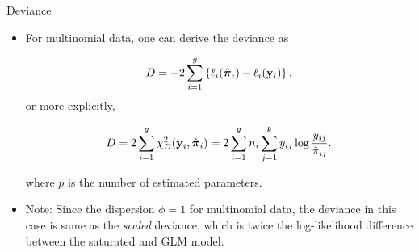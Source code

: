 \documentclass{beamer}
\newcommand{\boldpi}{{\boldsymbol \pi}}
\newcommand{\ringLambda}{\mathring{\Lambda}}
\newenvironment{wideitemize}%
  {\begin{itemize}%
    \setlength{\parskip}{1em}}%
  {\end{itemize}}
\begin{document}
%

\begin{frame}{Deviance}
\begin{wideitemize}
\item For multinomial data, one can derive the deviance as 

$$D=-2\sum_{i=1}^g\left\{\ell_i(\hat{\mbox{\boldmath $\pi$}}_i)-\ell_i(\textbf{y}_i)\right\},$$
or more explicitly,

$$D=2\sum_{i=1}^g\chi_D^2(\textbf{y}_i, \hat{\mbox{\boldmath $\pi$}}_i)=
2\sum_{i=1}^g n_i\sum_{j=1}^k y_{ij}\log\frac{y_{ij}}{\hat{\pi}_{ij}}.
$$

where $p$ is the number of estimated parameters.

\item Note: Since the dispersion $\phi = 1$ for multinomial data, the deviance in this case is same as the \emph{scaled} deviance, which is twice the log-likelihood difference between the saturated and GLM model. 
\end{wideitemize}
\end{frame}
\end{document}
